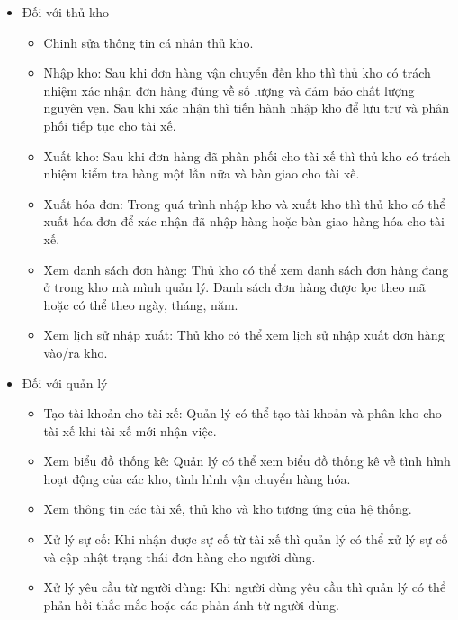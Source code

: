 \begin{itemize}
	                
				\item Đối với thủ kho
			    	\begin{itemize}
			    	    \item Chinh sửa thông tin cá nhân thủ kho.
	                    \item Nhập kho: Sau khi đơn hàng vận chuyển đến kho thì thủ kho có trách nhiệm xác nhận đơn hàng đúng về số lượng và đảm bảo chất lượng nguyên vẹn. Sau khi xác nhận thì tiến hành nhập kho để lưu trữ và phân phối tiếp tục cho tài xế.
	                    \item Xuất kho: Sau khi đơn hàng đã phân phối cho tài xế thì thủ kho có trách nhiệm kiểm tra hàng một lần nữa và bàn giao cho tài xế. 
	                    \item Xuất hóa đơn: Trong quá trình nhập kho và xuất kho thì thủ kho có thể xuất hóa đơn để xác nhận đã nhập hàng hoặc bàn giao hàng hóa cho tài xế.
	                    \item Xem danh sách đơn hàng: Thủ kho có thể xem danh sách đơn hàng đang ở trong kho mà mình quản lý. Danh sách đơn hàng được lọc theo mã hoặc có thể theo ngày, tháng, năm.
	                    \item Xem lịch sử nhập xuất: Thủ kho có thể xem lịch sử nhập xuất đơn hàng vào/ra kho.
	                \end{itemize}
	                
	                
				\item Đối với quản lý
				    \begin{itemize}
	                    \item Tạo tài khoản cho tài xế: Quản lý có thể tạo tài khoản và phân kho cho tài xế khi tài xế mới nhận việc.
	                    \item Xem biểu đồ thống kê: Quản lý có thể xem biểu đồ thống kê về tình hình hoạt động của các kho, tình hình vận chuyển hàng hóa.
	                    \item Xem thông tin các tài xế, thủ kho và kho tương ứng của hệ thống.
	                    \item Xử lý sự cố: Khi nhận được sự cố từ tài xế thì quản lý có thể xử lý sự cố và cập nhật trạng thái đơn hàng cho người dùng.
	                    \item Xử lý yêu cầu từ người dùng: Khi người dùng yêu cầu thì quản lý có thể phản hồi thắc mắc hoặc các phản ánh từ người dùng.
	                \end{itemize}
		\end{itemize}
    
